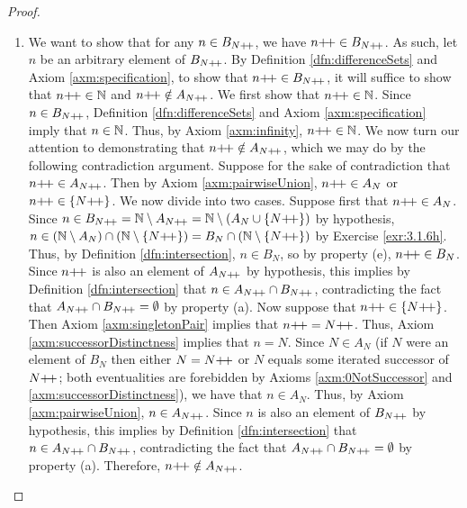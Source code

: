 \documentclass[../main.tex]{subfiles}
\begin{document}
\begin{enumerate}[ref={\thesection.\arabic*}]
\begin{proof}
\begin{enumerate}
            \item We want to show that for any $n\in B_{N{+\!+}}$, we have $n{+\!+}\in B_{N{+\!+}}$. As such, let $n$ be an arbitrary element of $B_{N{+\!+}}$. By Definition \ref{dfn:differenceSets} and Axiom \ref{axm:specification}, to show that $n{+\!+}\in B_{N{+\!+}}$, it will suffice to show that $n{+\!+}\in\mathbb{N}$ and $n{+\!+}\notin A_{N{+\!+}}$. We first show that $n{+\!+}\in\mathbb{N}$. Since $n\in B_{N{+\!+}}$, Definition \ref{dfn:differenceSets} and Axiom \ref{axm:specification} imply that $n\in\mathbb{N}$. Thus, by Axiom \ref{axm:infinity}, $n{+\!+}\in\mathbb{N}$. We now turn our attention to demonstrating that $n{+\!+}\notin A_{N{+\!+}}$, which we may do by the following contradiction argument. Suppose for the sake of contradiction that $n{+\!+}\in A_{N{+\!+}}$. Then by Axiom \ref{axm:pairwiseUnion}, $n{+\!+}\in A_N$ or $n{+\!+}\in\{N{+\!+}\}$. We now divide into two cases. Suppose first that $n{+\!+}\in A_N$. Since $n\in B_{N{+\!+}}=\mathbb{N}\setminus A_{N{+\!+}}=\mathbb{N}\setminus(A_N\cup\{N{+\!+}\})$ by hypothesis, $n\in(\mathbb{N}\setminus A_N)\cap(\mathbb{N}\setminus\{N{+\!+}\})=B_N\cap(\mathbb{N}\setminus\{N{+\!+}\})$ by Exercise \ref{exr:3.1.6h}. Thus, by Definition \ref{dfn:intersection}, $n\in B_N$, so by property (e), $n{+\!+}\in B_N$. Since $n{+\!+}$ is also an element of $A_{N{+\!+}}$ by hypothesis, this implies by Definition \ref{dfn:intersection} that $n\in A_{N{+\!+}}\cap B_{N{+\!+}}$, contradicting the fact that $A_{N{+\!+}}\cap B_{N{+\!+}}=\emptyset$ by property (a). Now suppose that $n{+\!+}\in\{N{+\!+}\}$. Then Axiom \ref{axm:singletonPair} implies that $n{+\!+}=N{+\!+}$. Thus, Axiom \ref{axm:successorDistinctness} implies that $n=N$. Since $N\in A_N$ (if $N$ were an element of $B_N$ then either $N=N{+\!+}$ or $N$ equals some iterated successor of $N{+\!+}$; both eventualities are forebidden by Axioms \ref{axm:0NotSuccessor} and \ref{axm:successorDistinctness}), we have that $n\in A_N$. Thus, by Axiom \ref{axm:pairwiseUnion}, $n\in A_{N{+\!+}}$. Since $n$ is also an element of $B_{N{+\!+}}$ by hypothesis, this implies by Definition \ref{dfn:intersection} that $n\in A_{N{+\!+}}\cap B_{N{+\!+}}$, contradicting the fact that $A_{N{+\!+}}\cap B_{N{+\!+}}=\emptyset$ by property (a). Therefore, $n{+\!+}\notin A_{N{+\!+}}$.

\end{enumerate}
\end{proof}
\end{enumerate}
\end{document}
